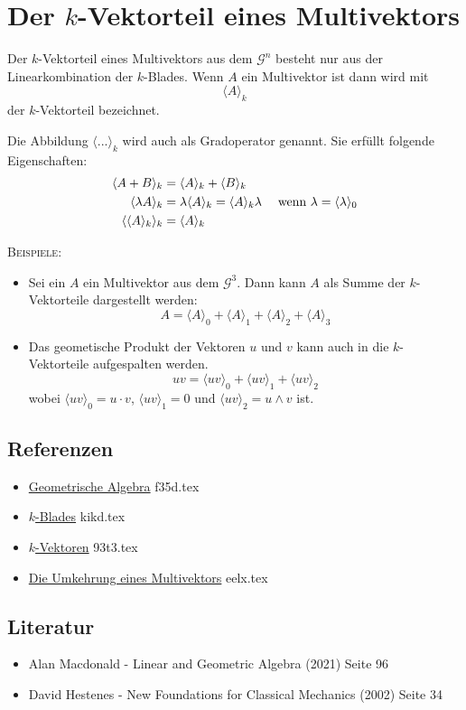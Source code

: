 \documentclass{sajzk}
\begin{document}
\section{\texorpdfstring{Der $k$-Vektorteil eines Multivektors}{Der k-Vektorteil eines Multivektors}}
\label{oagu}
Der $k$-Vektorteil eines Multivektors aus dem $\mathscr{G}^n$ besteht nur aus der Linearkombination der $k$-Blades. Wenn $A$ ein Multivektor ist dann wird mit
\[
\langle A\rangle_k
\]
der $k$-Vektorteil bezeichnet.

Die Abbildung $\langle ...\rangle_k$ wird auch als Gradoperator genannt. Sie erfüllt folgende Eigenschaften:
\begin{align*}
  \langle A + B\rangle_k &= \langle A \rangle_k + \langle B \rangle_k \\
  \langle \lambda A\rangle_k &= \lambda \langle A \rangle_k = \langle
  A\rangle_k\lambda\hspace{3ex}\textrm{wenn }\lambda = \langle\lambda\rangle_0 \\
  \langle\langle A\rangle_k\rangle_k &= \langle A \rangle_k
\end{align*}

\textsc{Beispiele:}
\begin{itemize}
  \item  Sei ein $A$ ein Multivektor aus dem $\mathscr{G}^3$. Dann kann $A$ als Summe der
  $k$-Vektorteile dargestellt werden:
  \[
  A = \langle A\rangle_0 + \langle A\rangle_1 + \langle A\rangle_2 + \langle A\rangle_3
  \]
  \item Das geometische Produkt der Vektoren $u$ und $v$ kann auch in die
  $k$-Vektorteile aufgespalten werden.
  \[
  uv = \langle uv\rangle_0 + \langle uv\rangle_1 + \langle uv\rangle_2
  \]
  wobei $\langle uv\rangle_0 = u \cdot v$, $\langle uv\rangle_1 = 0$ und $\langle uv\rangle_2 = u\wedge v$ ist.
\end{itemize}

\subsection{Referenzen}
\begin{itemize}
    \item \href{f35d.pdf}{Geometrische Algebra} f35d.tex
    \item \href{kikd.pdf}{$k$-Blades} kikd.tex
    \item \href{93t3.pdf}{$k$-Vektoren} 93t3.tex
    \item \href{eelx.pdf}{Die Umkehrung eines Multivektors} eelx.tex
\end{itemize}

\subsection{Literatur}
\begin{itemize}
    \item Alan Macdonald - Linear and Geometric Algebra (2021) Seite 96
    \item David Hestenes - New Foundations for Classical Mechanics (2002) Seite 34
\end{itemize}
\end{document}
